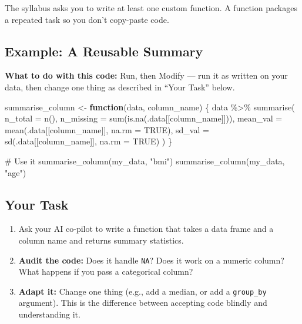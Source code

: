\documentclass[
  letterpaper,
  DIV=11,
  numbers=noendperiod,
  oneside]{scrreprt}
\newenvironment{Shaded}{\begin{snugshade}}{\end{snugshade}}
\newcommand{\AttributeTok}[1]{\textcolor[rgb]{0.40,0.45,0.13}{#1}}
\newcommand{\CommentTok}[1]{\textcolor[rgb]{0.37,0.37,0.37}{#1}}
\newcommand{\ConstantTok}[1]{\textcolor[rgb]{0.56,0.35,0.01}{#1}}
\newcommand{\ControlFlowTok}[1]{\textcolor[rgb]{0.00,0.23,0.31}{\textbf{#1}}}
\newcommand{\FunctionTok}[1]{\textcolor[rgb]{0.28,0.35,0.67}{#1}}
\newcommand{\NormalTok}[1]{\textcolor[rgb]{0.00,0.23,0.31}{#1}}
\newcommand{\OtherTok}[1]{\textcolor[rgb]{0.00,0.23,0.31}{#1}}
\newcommand{\SpecialCharTok}[1]{\textcolor[rgb]{0.37,0.37,0.37}{#1}}
\newcommand{\StringTok}[1]{\textcolor[rgb]{0.13,0.47,0.30}{#1}}
\providecommand{\tightlist}{%
  \setlength{\itemsep}{0pt}\setlength{\parskip}{0pt}}
\begin{document}

The syllabus asks you to write at least one custom function. A function
packages a repeated task so you don't copy-paste code.

\subsection*{Example: A Reusable
Summary}\label{example-a-reusable-summary}

\textbf{What to do with this code:} Run, then Modify --- run it as
written on your data, then change one thing as described in ``Your
Task'' below.

\begin{Shaded}
\begin{Highlighting}[numbers=left,,]
\NormalTok{summarise\_column }\OtherTok{\textless{}{-}} \ControlFlowTok{function}\NormalTok{(data, column\_name) \{}
\NormalTok{  data }\SpecialCharTok{\%\textgreater{}\%}
    \FunctionTok{summarise}\NormalTok{(}
      \AttributeTok{n\_total   =} \FunctionTok{n}\NormalTok{(),}
      \AttributeTok{n\_missing =} \FunctionTok{sum}\NormalTok{(}\FunctionTok{is.na}\NormalTok{(.data[[column\_name]])),}
      \AttributeTok{mean\_val  =} \FunctionTok{mean}\NormalTok{(.data[[column\_name]], }\AttributeTok{na.rm =} \ConstantTok{TRUE}\NormalTok{),}
      \AttributeTok{sd\_val    =} \FunctionTok{sd}\NormalTok{(.data[[column\_name]], }\AttributeTok{na.rm =} \ConstantTok{TRUE}\NormalTok{)}
\NormalTok{    )}
\NormalTok{\}}

\CommentTok{\# Use it}
\FunctionTok{summarise\_column}\NormalTok{(my\_data, }\StringTok{"bmi"}\NormalTok{)}
\FunctionTok{summarise\_column}\NormalTok{(my\_data, }\StringTok{"age"}\NormalTok{)}
\end{Highlighting}
\end{Shaded}

\subsection*{Your Task}\label{your-task}

\begin{enumerate}
\def\labelenumi{\arabic{enumi}.}
\tightlist
\item
  Ask your AI co-pilot to write a function that takes a data frame and a
  column name and returns summary statistics.
\item
  \textbf{Audit the code:} Does it handle \texttt{NA}? Does it work on a
  numeric column? What happens if you pass a categorical column?
\item
  \textbf{Adapt it:} Change one thing (e.g., add a median, or add a
  \texttt{group\_by} argument). This is the difference between accepting
  code blindly and understanding it.
\end{enumerate}
\end{document}
